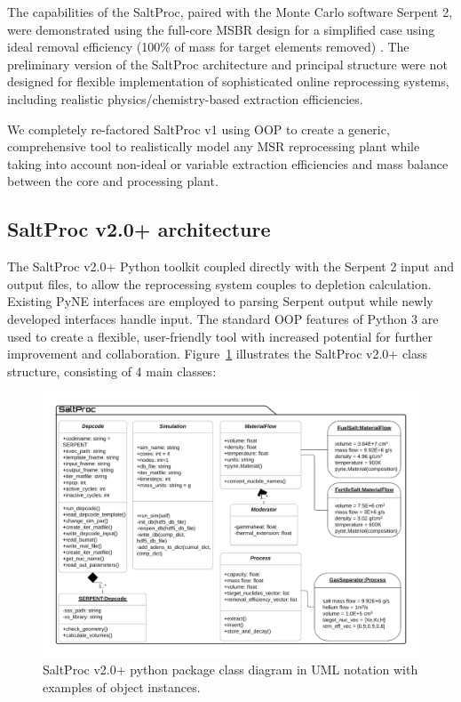 \documentclass[12pt]{article} %
\begin{document}
The capabilities of the SaltProc, paired with the Monte Carlo software 
Serpent 2, were demonstrated using the full-core MSBR design for a simplified  
case using ideal removal efficiency (100\% of mass for target elements 
removed) \cite{rykhlevskii_modeling_2019}. The preliminary version of the 
SaltProc architecture and principal structure were not designed for flexible 
implementation of sophisticated online reprocessing systems, including 
realistic physics/chemistry-based extraction efficiencies. 

We completely re-factored SaltProc v1 using \gls{OOP} to create a generic, 
comprehensive tool to realistically model any \gls{MSR} reprocessing plant 
while taking into account non-ideal or variable extraction efficiencies and 
mass balance between the core and processing plant.

\subsection{SaltProc v2.0+ architecture}
The SaltProc v2.0+ Python toolkit coupled directly with the Serpent 2 input 
and output files, to allow the reprocessing system couples to depletion 
calculation. Existing PyNE interfaces are employed to parsing Serpent output  
while newly developed interfaces handle input. The standard \gls{OOP} features 
of Python 3 are used to create a flexible, user-friendly tool with increased  
potential for further improvement and collaboration.  
Figure~\ref{fig:saltproc_class} illustrates the SaltProc v2.0+ class 
structure, consisting of 4 main classes:
\begin{figure}[ht!] %
  \includegraphics[width=1.07\textwidth]{saltproc_class_diagram.png}
  	  	\vspace{-0.35in}
  \caption{SaltProc v2.0+ python package class diagram in UML notation with  
  examples of object instances.}
  \label{fig:saltproc_class}
\end{figure}
\end{document}
